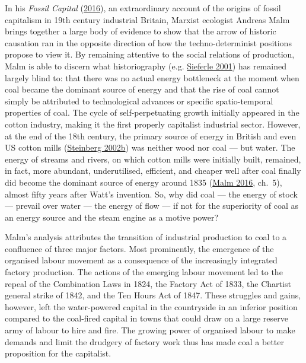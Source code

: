 \documentclass[a4paper, nobind]{templates/ociamthesis}
\begin{document}
In his \emph{Fossil Capital} (\protect\hyperlink{ref-malm_fossil_2016}{2016}), an extraordinary account of the origins of fossil capitalism in 19th century industrial Britain, Marxist ecologist Andreas Malm brings together a large body of evidence to show that the arrow of historic causation ran in the opposite direction of how the techno-determinist positions propose to view it. By remaining attentive to the social relations of production, Malm is able to discern what historiography (e.g. \protect\hyperlink{ref-sieferle_subterranean_2001}{Sieferle 2001}) has remained largely blind to: that there was no actual energy bottleneck at the moment when coal became the dominant source of energy and that the rise of coal cannot simply be attributed to technological advances or specific spatio-temporal properties of coal. The cycle of self-perpetuating growth initially appeared in the cotton industry, making it the first properly capitalist industrial sector. However, at the end of the 18th century, the primary source of energy in British and even US cotton mills (\protect\hyperlink{ref-steinberg_earth_2002a}{Steinberg 2002b}) was neither wood nor coal --- but water. The energy of streams and rivers, on which cotton mills were initially built, remained, in fact, more abundant, underutilised, efficient, and cheaper well after coal finally did become the dominant source of energy around 1835 (\protect\hyperlink{ref-malm_fossil_2016}{Malm 2016}, ch.~5), almost fifty years after Watt's invention. So, why did coal --- the energy of stock --- prevail over water --- the energy of flow --- if not for the superiority of coal as an energy source and the steam engine as a motive power?

Malm's analysis attributes the transition of industrial production to coal to a confluence of three major factors. Most prominently, the emergence of the organised labour movement as a consequence of the increasingly integrated factory production. The actions of the emerging labour movement led to the repeal of the Combination Laws in 1824, the Factory Act of 1833, the Chartist general strike of 1842, and the Ten Hours Act of 1847. These struggles and gains, however, left the water-powered capital in the countryside in an inferior position compared to the coal-fired capital in towns that could draw on a large reserve army of labour to hire and fire. The growing power of organised labour to make demands and limit the drudgery of factory work thus has made coal a better proposition for the capitalist.
\end{document}
